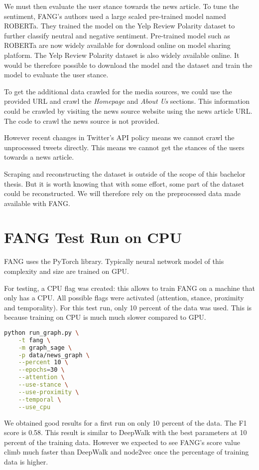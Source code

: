 We must then evaluate the user stance towards the news article.
To tune the sentiment, FANG's authors used a large scaled pre-trained model named ROBERTa. They trained the model on the Yelp Review Polarity dataset to further classify neutral and negative sentiment.
Pre-trained model such as ROBERTa are now widely available for download online on model sharing platform.
The Yelp Review Polarity dataset is also widely available online.
It would be therefore possible to download the model and the dataset and train the model to evaluate the user stance.

To get the additional data crawled for the media sources, we could use the provided URL and crawl the \textit{Homepage} and \textit{About Us} sections.
This information could be crawled by visiting the news source website using the news article URL.
The code to crawl the news source is not provided.

However recent changes in Twitter's API policy means we cannot crawl the unprocessed tweets directly.
This means we cannot get the stances of the users towards a news article.

Scraping and reconstructing the dataset is outside of the scope of this bachelor thesis.
But it is worth knowing that with some effort, some part of the dataset could be reconstructed.
We will therefore rely on the preprocessed data made available with FANG.

\newpage
\section{FANG Test Run on CPU}

FANG uses the PyTorch library. 
Typically neural network model of this complexity and size are trained on GPU.

For testing, a CPU flag was created: this allows to train FANG on a machine that only has a CPU.
All possible flags were activated (attention, stance, proximity and temporality).
For this test run, only 10 percent of the data was used.
This is because training on CPU is much much slower compared to GPU.

\begin{lstlisting}[language=bash]
python run_graph.py \
    -t fang \
    -m graph_sage \
    -p data/news_graph \
    --percent 10 \
    --epochs=30 \
    --attention \
    --use-stance \
    --use-proximity \
    --temporal \
    --use_cpu
\end{lstlisting}

We obtained good results for a first run on only 10 percent of the data.
The F1 score is 0.58.
This result is similar to DeepWalk with the best parameters at 10 percent of the training data. 
However we expected to see FANG's score value climb much faster than DeepWalk and node2vec once the percentage of training data is higher.

